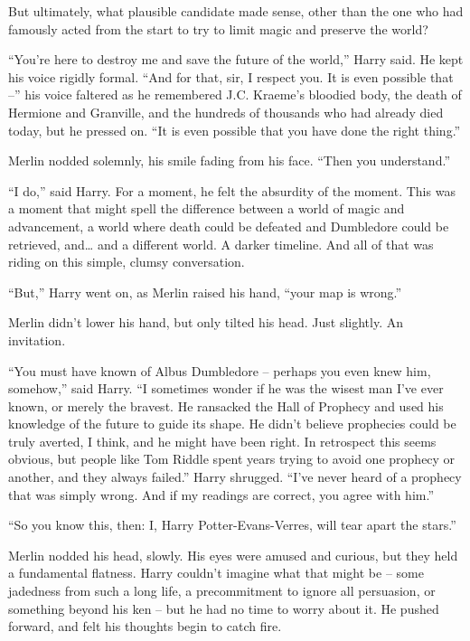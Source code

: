 But ultimately, what plausible candidate made sense, other than the one
who had famously acted from the start to try to limit magic and preserve
the world?

``You're here to destroy me and save the future of the world,'' Harry
said. He kept his voice rigidly formal. ``And for that, sir, I respect
you. It is even possible that --'' his voice faltered as he remembered
J.C. Kraeme's bloodied body, the death of Hermione and Granville, and
the hundreds of thousands who had already died today, but he pressed on.
``It is even possible that you have done the right thing.''

Merlin nodded solemnly, his smile fading from his face. ``Then you
understand.''

``I do,'' said Harry. For a moment, he felt the absurdity of the moment.
This was a moment that might spell the difference between a world of
magic and advancement, a world where death could be defeated and
Dumbledore could be retrieved, and\ldots{} and a different world. A
darker timeline. And all of that was riding on this simple, clumsy
conversation.

``But,'' Harry went on, as Merlin raised his hand, ``your map is
wrong.''

Merlin didn't lower his hand, but only tilted his head. Just slightly.
An invitation.

``You must have known of Albus Dumbledore -- perhaps you even knew him,
somehow,'' said Harry. ``I sometimes wonder if he was the wisest man
I've ever known, or merely the bravest. He ransacked the Hall of
Prophecy and used his knowledge of the future to guide its shape. He
didn't believe prophecies could be truly averted, I think, and he might
have been right. In retrospect this seems obvious, but people like Tom
Riddle spent years trying to avoid one prophecy or another, and they
always failed.'' Harry shrugged. ``I've never heard of a prophecy that
was simply wrong. And if my readings are correct, you agree with him.''

``So you know this, then: I, Harry Potter-Evans-Verres, will tear apart
the stars.''

Merlin nodded his head, slowly. His eyes were amused and curious, but
they held a fundamental flatness. Harry couldn't imagine what that might
be -- some jadedness from such a long life, a precommitment to ignore
all persuasion, or something beyond his ken -- but he had no time to
worry about it. He pushed forward, and felt his thoughts begin to catch
fire.


